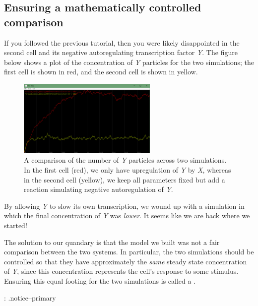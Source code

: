 \FloatBarrier
{}
\subsection{Ensuring a mathematically controlled comparison}

If you followed the previous tutorial, then you were likely disappointed in the second cell and its negative autoregulating transcription factor \textit{Y}. The figure below shows a plot of the concentration of \textit{Y} particles for the two simulations; the first cell is shown in red, and the second cell is shown in yellow.

\begin{figure}[h]
\centering
\mySfFamily
\includegraphics[width = 0.6\textwidth]{../assets/images/600px/nar_unequal_chart.png}
\caption{A comparison of the number of \textit{Y} particles across two simulations. In the first cell (red), we only have upregulation of \textit{Y} by \textit{X}, whereas in the second cell (yellow), we keep all parameters fixed but add a reaction simulating negative autoregulation of \textit{Y}.}
\label{fig:nar_unequal_chart}
\end{figure}

By allowing \textit{Y} to slow its own transcription, we wound up with a simulation in which the final concentration of \textit{Y} was \textit{lower}. It seems like we are back where we started!

The solution to our quandary is that the model we built was not a fair comparison between the two systems. In particular, the two simulations should be controlled so that they have approximately the \textit{same} steady state concentration of \textit{Y}, since this concentration represents the cell's response to some stimulus. Ensuring this equal footing for the two simulations is called a .

\begin{qbox}\end{qbox} 
{: .notice--primary}

